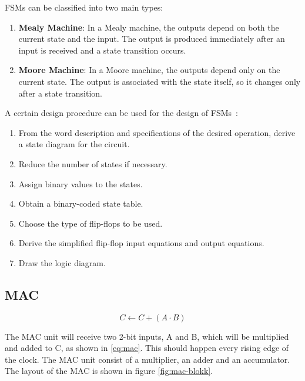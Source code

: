 \noindent
FSMs can be classified into two main types:

\begin{enumerate}
    \item \textbf{Mealy Machine}: In a Mealy machine, the outputs depend on both the current state and the input. The output is produced immediately after an input is received and a state transition occurs.
    
    \item \textbf{Moore Machine}: In a Moore machine, the outputs depend only on the current state. The output is associated with the state itself, so it changes only after a state transition.
\end{enumerate}
\noindent
A certain design procedure can be used for the design of FSMs~\cite{digital_design}:

\begin{enumerate}
  \item From the word description and specifications of the desired operation, derive a state diagram for the circuit.
  \item Reduce the number of states if necessary.
  \item Assign binary values to the states.
  \item Obtain a binary-coded state table.
  \item Choose the type of flip-flops to be used.
  \item Derive the simplified flip-flop input equations and output equations.
  \item Draw the logic diagram.
\end{enumerate}


\subsection{MAC}
\label{subsec:MAC_theory}

\begin{equation}
    \label{eq:mac}
    C \leftarrow C + (A \cdot B)
\end{equation}

The MAC unit will receive two 2-bit inputs, A and B, which will be multiplied and added to C, as shown in \ref{eq:mac}. This should happen every rising edge of the clock. The MAC unit consist of a multiplier, an adder and an accumulator. The layout of the MAC is shown in figure \ref{fig:mac-blokk}. 

